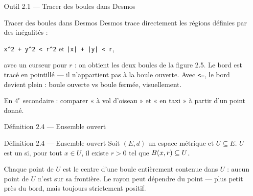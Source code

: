\begin{frame}{Outil 2.1 --- Tracer des boules dans Desmos}
  \begin{Outil}{Tracer des boules dans Desmos}
    \small Desmos trace directement les régions définies par des
    inégalités :
    \begin{center}
      \texttt{x\^{}2 + y\^{}2 < r\^{}2} \qquad et \qquad
      \texttt{|x| + |y| < r},
    \end{center}
    avec un curseur pour $r$ : on obtient les deux boules de la
    figure 2.5. Le bord est tracé en pointillé --- il
    n'appartient pas à la boule ouverte. Avec \texttt{<=}, le bord
    devient plein : boule ouverte vs boule fermée, visuellement.
    \vspace{4pt}

    En $4^{\text{e}}$ secondaire : comparer « à vol d'oiseau » et « en
    taxi » à partir d'un point donné.
  \end{Outil}
\end{frame}

\begin{frame}{Définition 2.4 --- Ensemble ouvert}
  \begin{Enonce}{Définition 2.4 --- Ensemble ouvert}
    Soit $(E,d)$ un espace métrique et $U\subseteq E$. $U$ est un
     si, pour tout $x\in U$, il existe $r>0$ tel
    que $B(x, r)\subseteq U$.
  \end{Enonce}
  \small Chaque point de $U$ est le centre d'une boule entièrement
  contenue dans $U$ : aucun point de $U$ n'est sur sa frontière. Le
  rayon peut dépendre du point --- plus petit près du bord, mais
  toujours strictement positif.
\end{frame}

